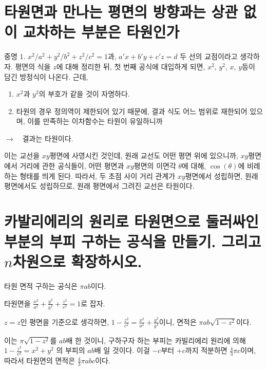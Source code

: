\section{타원면과 만나는 평면의 방향과는 상관 없이 교차하는 부분은 타원인가}

중명 1.
$x ^{2} /a ^{2} +y ^{2} /b ^{2} +z ^{2} /c ^{2} =1$과, $a' x+b' y+c' z=d$ 두 선의 교점이라고 생각하자. 평면의 식을 $z$에 대해 정리한 뒤, 첫 번째 공식에 대입하게 되면, $x^2$, $y^2$, $x$, $y$등이 담긴 방정식이 나온다. 근데, 
\begin{enumerate}
    \item  $x^2$과 $y^2$의 부호가 같을 것이 자명하다. 
    \item 타원의 경우 정의역이 제한되어 있기 때문에, 결과 식도 어느 범위로 재한되어 있으며, 이를 만족하는 이차함수는 타원이 유일하니까
\end{enumerate}
$\to$　결과는 타원이다.

이는 교선을 $xy$평면에 사영시킨 것인데, 원래 교선도 어떤 평면 위에 있으니까,
$xy$평면에서 거리에 관한 공식들이, 어떤 평면과 $xy$평면의 이면각 $\theta$에 대해, $\cos(\theta)$에 비례하는 형태를 띄게 된다. 
따라서, 두 초점 사이 거리 관계가 $xy$평면에서 성립하면, 원래 평면에서도 성립하므로, 원래 평면에서 그려진 교선은 타원이다.

\section{카발리에리의 원리로 타원면으로 둘러싸인 부분의 부피 구하는 공식을 만들기. 그리고 $n$차원으로 확장하시오.}
타원 면적 구하는 공식은 $\pi a b$이다.

타원면을  $ \frac{x ^2}{a^2} +\frac{y^2}{b^2} + \frac{z^2}{c^2} =1$로 잡자.

$z=z$인 평면을 기준으로 생각하면, $1 - \frac{z ^{2}}{c^2} = \frac{x ^2}{a^2} +\frac{y^2}{b^2}  $이니, 면적은 $\pi ab \sqrt {1-z ^{2}}$이다.

이는 $\pi \sqrt {1-z ^{2}}$를 $ab$배 한 것이니, 
구하구자 하는 부피는 카빌리에리 원리에 의해 $1- \frac{z^2}{c^2} =x ^{2} +y ^{2}$ 의 부피의 $ab$배 일 것이다.
이걸 $-c$부터 $+c$까지 적분하면 $\frac{4}{3}\pi c$이며, 따라서 타원면의 면적은 $\frac{4}{3}\pi abc$이다.
